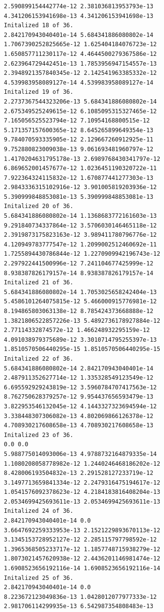 \documentclass[11pt]{article}
\begin{document}
\begin{Verbatim}[commandchars=\\\{\}]
2.590899154442774e-12 2.381036813953793e-13
4.341206153941698e-13 4.341206153941698e-13
Initalized 18 of 36.
2.842170943040401e-14 5.684341886080802e-14
1.7067390252825665e-12 1.625404184076723e-12
1.650857711230117e-12 4.4644500279367586e-12
2.623964729442451e-13 1.7853956947154557e-13
2.3948921357840345e-12 2.142541963385332e-12
4.539983958089127e-14 4.539983958089127e-14
Initalized 19 of 36.
2.2737367544323206e-13 5.684341886080802e-14
2.675349525249615e-12 6.1085095315327465e-12
7.165056525523794e-12 7.10954168800515e-12
5.171357157600365e-12 8.645265899649354e-13
9.784070593335905e-12 2.129667260912925e-11
9.752880823009038e-13 9.061693481960797e-12
1.4170204631795178e-13 2.6989768430341797e-12
6.869652001457677e-12 1.0236451190320722e-11
7.922364324115832e-12 1.670877441277303e-13
2.9843336315102916e-12 3.901005819203936e-12
5.390999848853081e-13 5.390999848853081e-13
Initalized 20 of 36.
5.684341886080802e-14 1.1368683772161603e-13
9.291840734337864e-12 3.5706030146465118e-12
2.3919873175823163e-12 3.989411780796776e-12
4.120949783777547e-12 1.2099002512460692e-11
1.7255894430786844e-12 1.2270909942196743e-12
2.297922441500996e-12 7.241104677425999e-12
8.938387826179157e-14 8.938387826179157e-14
Initalized 21 of 36.
5.684341886080802e-14 1.7053025658242404e-13
5.4586101264075815e-12 5.466000915776981e-12
8.194865803063138e-12 8.785424373668888e-12
1.3821806522857226e-13 5.4892736178927884e-12
2.77114332874572e-12 1.466248932295159e-12
4.091038979375689e-12 3.3010714795255397e-13
1.8510570506440295e-15 1.8510570506440295e-15
Initalized 22 of 36.
5.684341886080802e-14 2.842170943040401e-14
2.487911352627714e-12 1.335328549123549e-12
6.695592929243819e-12 3.5960784707417563e-12
8.762750628379257e-12 9.954437656593479e-13
3.822953546132045e-12 4.1443327323694594e-12
3.338448307306082e-13 4.802069866126378e-12
4.708930217608658e-13 4.708930217608658e-13
Initalized 23 of 36.
0.0 0.0
5.988775014093006e-13 4.9788732164879335e-14
1.1080208058778982e-12 1.2440246468186202e-12
8.428006193504832e-13 2.291528127233719e-12
3.1497713659841334e-12 2.2479316475194617e-12
1.0541576092378623e-12 4.2184183816408204e-13
2.0534699425693611e-13 2.0534699425693611e-13
Initalized 24 of 36.
2.842170943040401e-14 0.0
3.6647692259333953e-13 2.1521229893670113e-12
3.1345153728952127e-12 2.285115797798592e-12
1.3965368505233717e-12 1.1857748715938279e-12
1.8073021457620938e-12 2.4436201146981474e-12
1.6908523656192116e-14 1.6908523656192116e-14
Initalized 25 of 36.
2.842170943040401e-14 0.0
8.223672123049836e-13 1.0428012077977333e-12
2.981706114299935e-13 6.542987354808483e-13

\end{Verbatim}
\end{document}
